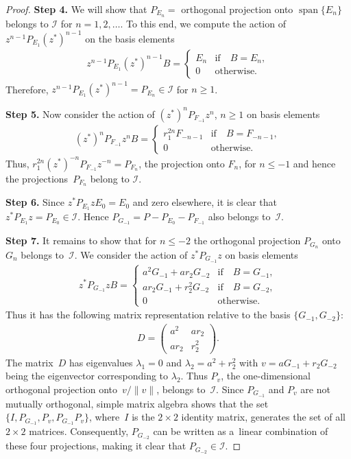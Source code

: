 \documentclass[pdftex]{sigma}
\numberwithin{equation}{section}
\begin{document}
\begin{proof}
{\bf Step 4.} We will show that $P_{E_n}= $ orthogonal projection onto $\operatorname{span}\{E_n\}$ belongs to $\mathcal I$ for $n=1,2,
\dots$.
To this end, we compute the action of $z^{n-1} P_{E_1} (z^*)^{n-1}$ on the basis elements
\begin{gather*}
z^{n-1} P_{E_1} (z^*)^{n-1} B=
\begin{cases}
E_n & \text{if}\quad  B=E_n,
\\
0 & \text{otherwise.}
\end{cases}
\end{gather*}
Therefore, $z^{n-1} P_{E_1} (z^*)^{n-1}= P_{E_n} \in \mathcal I$ for $n \geq 1$.

{\bf Step 5.} Now consider the action of $(z^*)^n P_{F_{-1}} z^n$, $n \geq 1$ on basis elements
\begin{gather*}
(z^*)^n P_{F_{-1}} z^n B=
\begin{cases}
r_1^{2n}F_{-n-1} & \text{if}\quad  B=F_{-n-1},
\\
0 & \text{otherwise.}
\end{cases}
\end{gather*}
Thus, $r_1^{2n}(z^*)^{-n} P_{F_{-1}} z^{-n}= P_{F_n}$, the projection onto $F_n$, for $n \leq -1$ and hence the
projec\-tions~$P_{F_n}$ belong to $\mathcal I$.

{\bf Step 6.} Since $z^* P_{E_1}z E_0=E_0$ and zero elsewhere, it is clear that $z^* P_{E_1}z =P_{E_0} \in \mathcal I$.
Hence $P_{G_{-1}}= P- P_{E_0}- P_{F_{-1}}$ also belongs to~$\mathcal I$.

{\bf Step 7.} It remains to show that for $n \leq -2$ the orthogonal projection $P_{G_n}$ onto $G_n$ belongs to~$\mathcal I$.
We consider the action of $z^* P_{G_{-1}}z$ on basis elements
\begin{gather*}
z^* P_{G_{-1}}z B=
\begin{cases}
a^2 G_{-1}+ar_2G_{-2} & \text{if}\quad  B=G_{-1},
\\
ar_2 G_{-1}+r_2^2G_{-2} & \text{if}\quad  B= G_{-2},
\\
0 & \text{otherwise}.
\end{cases}
\end{gather*}
Thus it has the following matrix representation relative to the basis $\{G_{-1}, G_{-2}\}$:
\begin{gather*}
D=\left(
\begin{matrix}
a^2 & ar_2
\\
ar_2 & r_2^2
\end{matrix}
\right).
\end{gather*}
The matrix~$D$ has eigenvalues $\lambda_1=0$ and $\lambda_2= a^2+r_2^2$ with $v= aG_{-1}+ r_2 G_{-2}$ being the
eigenvector corresponding to $\lambda_2$.
Thus $P_{v}$, the one-dimensional orthogonal projection onto~$v/\|v\|$, belongs to~$\mathcal I$.
Since $P_{G_{-1}}$ and $P_{v}$ are not mutually orthogonal, simple matrix algebra shows that the set $\{I, P_{G_{-1}},
P_{v}, P_{G_{-1}}P_{v}\}$, where~$I$ is the $2 \times 2$ identity matrix, generates the set of all $2 \times 2 $
matrices.
Consequently, $P_{G_{-2}}$ can be written as a~linear combination of these four projections, making it clear that
$P_{G_{-2}} \in \mathcal I$.


\end{proof}
\end{document}
